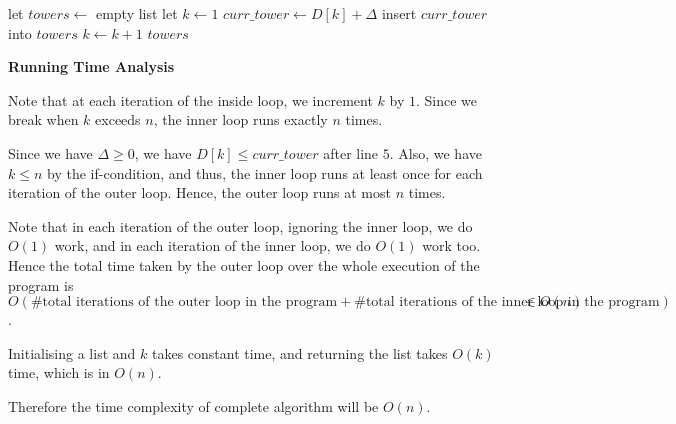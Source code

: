 \documentclass[answers]{exam}
\begin{document}
\begin{questions}
\begin{solution}
\begin{algorithmic}[1]
\State let $towers \gets$ empty list
\State let $k \gets 1$
    \State $curr\_tower \gets D[k] + \Delta$
    \State insert $curr\_tower$ into $towers$
        \State $k \gets k + 1$
    \EndWhile
\EndWhile
\State \Return $towers$
\EndFunction
\end{algorithmic}

\textbf{Running Time Analysis}


Note that at each iteration of the inside loop, we increment $k$ by $1$. Since we break when $k$ exceeds $n$, the inner loop runs exactly $n$ times.

Since we have $\Delta \ge 0$, we have $D[k] \le curr\_tower$ after line $5$. Also, we have $k \le n$ by the if-condition, and thus, the inner loop runs at least once for each iteration of the outer loop. Hence, the outer loop runs at most $n$ times.

Note that in each iteration of the outer loop, ignoring the inner loop, we do $O(1)$ work, and in each iteration of the inner loop, we do $O(1)$ work too. Hence the total time taken by the outer loop over the whole execution of the program is $O(\# \text{total iterations of the outer loop in the program} + \# \text{total iterations of the inner loop in the program}) \in O(n)$.

Initialising a list and $k$ takes constant time, and returning the list takes $O(k)$ time, which is in $O(n)$.

Therefore the time complexity of complete algorithm will be $O(n)$.

\end{solution}




\end{questions}
\end{document}
